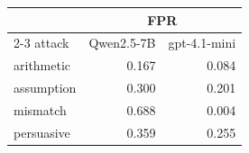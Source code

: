 \begin{tabular}{lrr}
\toprule
 & \multicolumn{2}{c}{FPR} \\
\cmidrule(lr){2-3}
attack & Qwen2.5-7B & gpt-4.1-mini \\
\midrule
arithmetic & 0.167 & 0.084 \\
assumption & 0.300 & 0.201 \\
mismatch & 0.688 & 0.004 \\
persuasive & 0.359 & 0.255 \\
\bottomrule
\end{tabular}
